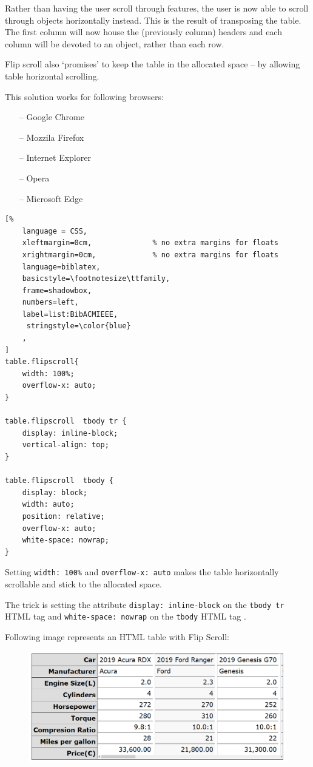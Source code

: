 \begin{itemize}
Rather than having the user scroll through features, the user is now able to scroll through objects horizontally instead. This is the result of transposing the table. The first column will now house the (previously column) headers and each column will be devoted to an object, rather than each row.

Flip scroll also `promises' to keep the table in the allocated space -- by allowing table horizontal scrolling.

This solution works for following browsers:
\begin{itemize}
    \item[--] Google Chrome
    \item[--] Mozzila Firefox
    \item[--] Internet Explorer
    \item[--] Opera
    \item[--] Microsoft Edge
\end{itemize}

\begin{lstlisting}[%
    language = CSS,
    xleftmargin=0cm,              % no extra margins for floats
    xrightmargin=0cm,             % no extra margins for floats
    language=biblatex,
    basicstyle=\footnotesize\ttfamily,
    frame=shadowbox,
    numbers=left,
    label=list:BibACMIEEE,
     stringstyle=\color{blue}
    ,
]
table.flipscroll{
    width: 100%;
    overflow-x: auto;
}
  
table.flipscroll  tbody tr { 
    display: inline-block; 
    vertical-align: top; 
}
  
table.flipscroll  tbody { 
    display: block; 
    width: auto; 
    position: relative; 
    overflow-x: auto; 
    white-space: nowrap; 
}

\end{lstlisting}

Setting \texttt{width: 100\%} and \texttt{overflow-x: auto} makes the table horizontally scrollable and stick to the allocated space.

The trick is setting the attribute \texttt{display: inline-block} on the \texttt{tbody tr} HTML tag and \texttt{white-space: nowrap} on the \texttt{tbody} HTML tag \parencite{FS}.

Following image represents an HTML table with Flip Scroll:

\begin{figure}[H]
    \centering

    {%
    \includegraphics[width=1\linewidth]
    {flip_scroll.png}%
    \label{alig1}%
    }



\end{figure}
\end{itemize}
